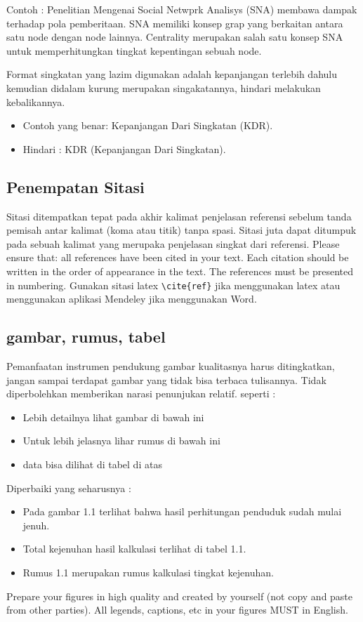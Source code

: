 Contoh : Penelitian Mengenai Social Netwprk Analisys (SNA) membawa dampak terhadap pola pemberitaan. SNA memiliki konsep grap yang berkaitan antara satu node dengan node lainnya. Centrality merupakan salah satu konsep SNA untuk memperhitungkan tingkat kepentingan sebuah node.

Format singkatan yang lazim digunakan adalah kepanjangan terlebih dahulu kemudian didalam kurung merupakan singakatannya, hindari melakukan kebalikannya. 
\begin{itemize}
\item Contoh yang benar: Kepanjangan Dari Singkatan (KDR). 
\item Hindari : KDR (Kepanjangan Dari Singkatan).
\end{itemize}

\subsection{Penempatan Sitasi}
Sitasi ditempatkan tepat pada akhir kalimat penjelasan referensi sebelum tanda 
pemisah antar kalimat (koma atau titik) tanpa spasi. 
Sitasi juta dapat ditumpuk pada sebuah kalimat yang merupaka  penjelasan singkat dari referensi. 
Please ensure that: all references have been cited in your text. Each citation should be written in the order of appearance in the text. The references must be presented in numbering. Gunakan sitasi latex \verb|\cite{ref}| jika menggunakan latex atau menggunakan aplikasi Mendeley jika menggunakan Word.

\subsection{gambar, rumus, tabel}
Pemanfaatan instrumen pendukung gambar kualitasnya harus ditingkatkan, jangan sampai terdapat gambar yang tidak bisa terbaca tulisannya.
Tidak diperbolehkan memberikan narasi penunjukan relatif. seperti :
\begin{itemize}
	\item Lebih detailnya lihat gambar di bawah ini
	\item Untuk lebih jelasnya lihar rumus di bawah ini
	\item data bisa dilihat di tabel di atas
\end{itemize}
Diperbaiki yang seharusnya :
\begin{itemize}
	\item Pada gambar 1.1 terlihat bahwa hasil perhitungan penduduk sudah mulai jenuh.
	\item Total kejenuhan hasil kalkulasi terlihat di tabel 1.1.
	\item Rumus 1.1 merupakan rumus kalkulasi tingkat kejenuhan.
\end{itemize}
Prepare your figures in high quality and created by yourself (not copy and paste from other parties). All legends, captions, etc in your figures MUST in English.



